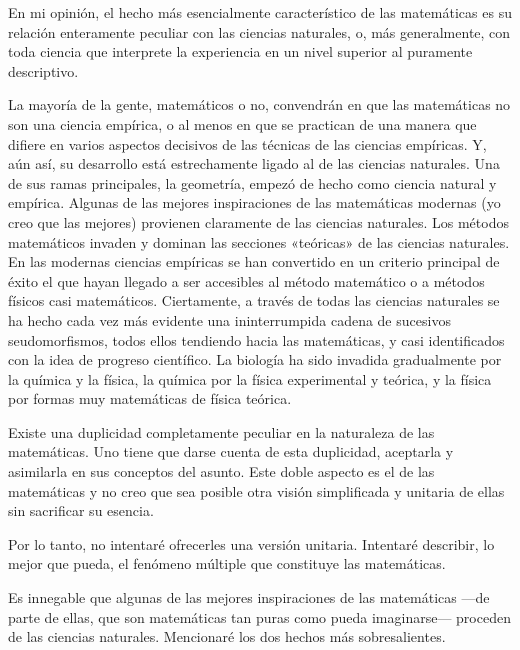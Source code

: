 \documentclass[a4paper, 12pt]{article}
\begin{document}
En mi opinión, el hecho más esencialmente característico de las matemáticas 
es su relación enteramente peculiar con las ciencias naturales, o, más generalmente, con toda ciencia que interprete la experiencia en un nivel superior al puramente descriptivo.

La mayoría de la gente, matemáticos o no, convendrán en que las matemáticas no son una ciencia empírica, o al menos en que se practican de una manera que difiere en varios aspectos decisivos de las técnicas de las ciencias empíricas. Y, aún así, su desarrollo está estrechamente ligado al de las ciencias naturales. Una de sus ramas principales, la geometría, empezó de hecho como ciencia natural y empírica. Algunas de las mejores inspiraciones de las matemáticas modernas (yo creo que las mejores) provienen claramente de las ciencias naturales. Los métodos matemáticos invaden y dominan las secciones «teóricas» de las ciencias naturales. En las modernas ciencias empíricas se han convertido en un criterio principal de éxito el que hayan llegado a ser accesibles al método matemático o a métodos físicos casi matemáticos. Ciertamente, a través de todas las ciencias naturales se ha hecho cada vez más evidente una ininterrumpida cadena de sucesivos seudomorfismos, todos ellos tendiendo hacia las matemáticas, y casi identificados con la idea de progreso científico. La biología ha sido invadida gradualmente por la química y la física, la química por la física experimental y teórica, y la física por formas muy matemáticas de física teórica.

Existe una duplicidad completamente peculiar en la naturaleza de las matemáticas. Uno tiene que darse cuenta de esta duplicidad, aceptarla y asimilarla en sus conceptos del asunto. Este doble aspecto es el de las matemáticas y no creo que sea posible otra visión simplificada y unitaria de ellas sin sacrificar su esencia.

Por lo tanto, no intentaré ofrecerles una versión unitaria. Intentaré describir, lo mejor que pueda, el fenómeno múltiple que constituye las matemáticas.

Es innegable que algunas de las mejores inspiraciones de las matemáticas ---de parte de ellas, que son matemáticas tan puras como pueda imaginarse--- proceden de las ciencias naturales. Mencionaré los dos hechos más sobresalientes.
\end{document}
